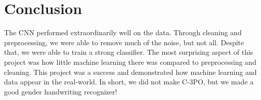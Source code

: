 \section{Conclusion}

The CNN performed extraordinarily well on the data.  Through cleaning and preprocessing, we were able to remove much of the noise, but not all.  Despite that, we were able to train a strong classifier.  The most surprising aspect of this project was how little machine learning there was compared to preprocessing and cleaning.  This project was a success and demonstrated how machine learning and data appear in the real-world.  In short, we did not make C-3PO, but we made a good gender handwriting recognizer!



